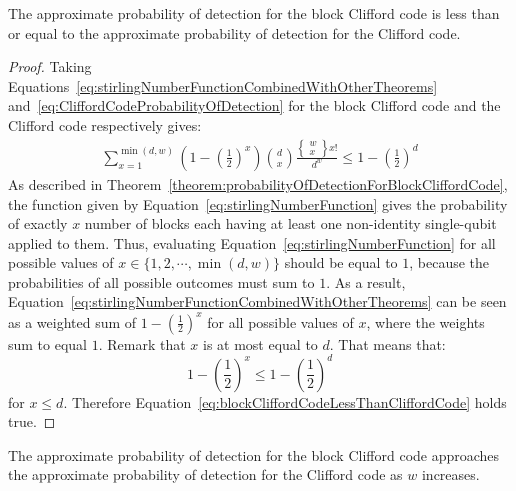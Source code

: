 \begin{theorem}
The approximate probability of detection for the block Clifford code is less than or equal to the approximate probability of detection for the Clifford code.
\end{theorem}
\begin{proof}
Taking Equations~\eqref{eq:stirlingNumberFunctionCombinedWithOtherTheorems} and~\eqref{eq:CliffordCodeProbabilityOfDetection} for the block Clifford code and the Clifford code respectively gives:
\begin{align}
\label{eq:blockCliffordCodeLessThanCliffordCode}
\sum_{x=1} ^{\min(d,w)} \left(1-\left(\frac{1}{2}\right)^{x}\right) {d \choose x} \frac{\left\{\begin{smallmatrix}w\\x\end{smallmatrix}\right\}x!}{d^w} \leq 1-\left(\frac{1}{2}\right)^{d}
\end{align}
As described in Theorem~\ref{theorem:probabilityOfDetectionForBlockCliffordCode}, the function given by Equation~\eqref{eq:stirlingNumberFunction} gives the probability of exactly $x$ number of blocks each having at least one non-identity single-qubit applied to them. Thus, evaluating Equation~\eqref{eq:stirlingNumberFunction} for all possible values of $x \in \{1,2, \cdots , \min (d,w)\}$ should be equal to $1$, because the probabilities of all possible outcomes must sum to $1$. As a result, Equation~\eqref{eq:stirlingNumberFunctionCombinedWithOtherTheorems} can be seen as a weighted sum of $1 - \left(\frac{1}{2}\right)^x$ for all possible values of $x$, where the weights sum to equal $1$. Remark that $x$ is at most equal to $d$. That means that:
$$1 - \left(\frac{1}{2}\right)^x \leq 1 - \left(\frac{1}{2}\right)^d$$ for $x \leq d$. Therefore Equation~\eqref{eq:blockCliffordCodeLessThanCliffordCode} holds true.
\end{proof}
\begin{theorem}
The approximate probability of detection for the block Clifford code approaches the approximate probability of detection for the Clifford code as $w$ increases.
\end{theorem}
